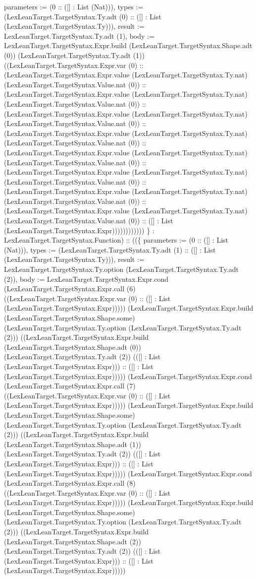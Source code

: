 \documentclass[11pt]{article}
\begin{document}
parameters := (0 :: ([] : List (Nat))), types := (LexLeanTarget.TargetSyntax.Ty.adt (0) :: ([] : List (LexLeanTarget.TargetSyntax.Ty))), result := LexLeanTarget.TargetSyntax.Ty.adt (1), body := LexLeanTarget.TargetSyntax.Expr.build (LexLeanTarget.TargetSyntax.Shape.adt (0)) (LexLeanTarget.TargetSyntax.Ty.adt (1)) ((LexLeanTarget.TargetSyntax.Expr.var (0) :: (LexLeanTarget.TargetSyntax.Expr.value (LexLeanTarget.TargetSyntax.Ty.nat) (LexLeanTarget.TargetSyntax.Value.nat (0)) :: (LexLeanTarget.TargetSyntax.Expr.value (LexLeanTarget.TargetSyntax.Ty.nat) (LexLeanTarget.TargetSyntax.Value.nat (0)) :: (LexLeanTarget.TargetSyntax.Expr.value (LexLeanTarget.TargetSyntax.Ty.nat) (LexLeanTarget.TargetSyntax.Value.nat (0)) :: (LexLeanTarget.TargetSyntax.Expr.value (LexLeanTarget.TargetSyntax.Ty.nat) (LexLeanTarget.TargetSyntax.Value.nat (0)) :: (LexLeanTarget.TargetSyntax.Expr.value (LexLeanTarget.TargetSyntax.Ty.nat) (LexLeanTarget.TargetSyntax.Value.nat (0)) :: (LexLeanTarget.TargetSyntax.Expr.value (LexLeanTarget.TargetSyntax.Ty.nat) (LexLeanTarget.TargetSyntax.Value.nat (0)) :: (LexLeanTarget.TargetSyntax.Expr.value (LexLeanTarget.TargetSyntax.Ty.nat) (LexLeanTarget.TargetSyntax.Value.nat (0)) :: (LexLeanTarget.TargetSyntax.Expr.value (LexLeanTarget.TargetSyntax.Ty.nat) (LexLeanTarget.TargetSyntax.Value.nat (0)) :: ([] : List (LexLeanTarget.TargetSyntax.Expr)))))))))))) \} : LexLeanTarget.TargetSyntax.Function) :: ((\{ parameters := (0 :: ([] : List (Nat))), types := (LexLeanTarget.TargetSyntax.Ty.adt (1) :: ([] : List (LexLeanTarget.TargetSyntax.Ty))), result := LexLeanTarget.TargetSyntax.Ty.option (LexLeanTarget.TargetSyntax.Ty.adt (2)), body := LexLeanTarget.TargetSyntax.Expr.cond (LexLeanTarget.TargetSyntax.Expr.call (6) ((LexLeanTarget.TargetSyntax.Expr.var (0) :: ([] : List (LexLeanTarget.TargetSyntax.Expr))))) (LexLeanTarget.TargetSyntax.Expr.build (LexLeanTarget.TargetSyntax.Shape.some) (LexLeanTarget.TargetSyntax.Ty.option (LexLeanTarget.TargetSyntax.Ty.adt (2))) ((LexLeanTarget.TargetSyntax.Expr.build (LexLeanTarget.TargetSyntax.Shape.adt (0)) (LexLeanTarget.TargetSyntax.Ty.adt (2)) (([] : List (LexLeanTarget.TargetSyntax.Expr))) :: ([] : List (LexLeanTarget.TargetSyntax.Expr))))) (LexLeanTarget.TargetSyntax.Expr.cond (LexLeanTarget.TargetSyntax.Expr.call (7) ((LexLeanTarget.TargetSyntax.Expr.var (0) :: ([] : List (LexLeanTarget.TargetSyntax.Expr))))) (LexLeanTarget.TargetSyntax.Expr.build (LexLeanTarget.TargetSyntax.Shape.some) (LexLeanTarget.TargetSyntax.Ty.option (LexLeanTarget.TargetSyntax.Ty.adt (2))) ((LexLeanTarget.TargetSyntax.Expr.build (LexLeanTarget.TargetSyntax.Shape.adt (1)) (LexLeanTarget.TargetSyntax.Ty.adt (2)) (([] : List (LexLeanTarget.TargetSyntax.Expr))) :: ([] : List (LexLeanTarget.TargetSyntax.Expr))))) (LexLeanTarget.TargetSyntax.Expr.cond (LexLeanTarget.TargetSyntax.Expr.call (8) ((LexLeanTarget.TargetSyntax.Expr.var (0) :: ([] : List (LexLeanTarget.TargetSyntax.Expr))))) (LexLeanTarget.TargetSyntax.Expr.build (LexLeanTarget.TargetSyntax.Shape.some) (LexLeanTarget.TargetSyntax.Ty.option (LexLeanTarget.TargetSyntax.Ty.adt (2))) ((LexLeanTarget.TargetSyntax.Expr.build (LexLeanTarget.TargetSyntax.Shape.adt (2)) (LexLeanTarget.TargetSyntax.Ty.adt (2)) (([] : List (LexLeanTarget.TargetSyntax.Expr))) :: ([] : List (LexLeanTarget.TargetSyntax.Expr))))) 
\end{document}
